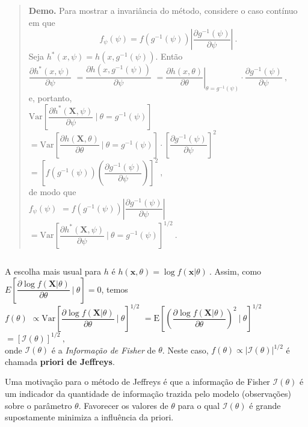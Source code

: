\documentclass[
]{book}
\begin{document}
\begin{quote}
\textbf{Demo.} Para mostrar a invariância do método, considere o caso contínuo em que
\[f_\psi(\psi) = f\left(g^{-1}(\psi)\right)\left|\dfrac{\partial g^{-1}(\psi)}{\partial\psi}\right|~.\]
Seja \(h^*(x,\psi)=h\left(x,g^{-1}(\psi)\right)\). Então\\
\(\dfrac{\partial h^*(x,\psi)}{\partial\psi}\)
\(=\dfrac{\partial h\left(x,g^{-1}(\psi)\right)}{\partial\psi}\)
\(=\left.\dfrac{\partial h(x,\theta)}{\partial\theta}\right|_{\theta=g^{-1}(\psi)}\cdot\dfrac{\partial g^{-1}(\psi)}{\partial\psi}~,\)\\
e, portanto,\\
\(\text{Var}\left[\dfrac{\partial h^*(\boldsymbol{X},\psi)}{\partial\psi}~\bigg|~\theta=g^{-1}(\psi)\right]\)
\(=\text{Var}\left[\dfrac{\partial h(\boldsymbol{X},\theta)}{\partial\theta}~\bigg|~\theta=g^{-1}(\psi)\right]\cdot\left[\dfrac{\partial g^{-1}(\psi)}{\partial\psi}\right]^2\)
\(=\left[f\left(g^{-1}(\psi)\right)\left(\dfrac{\partial g^{-1}(\psi)}{\partial\psi}\right)\right]^2~,\)\\
de modo que\\
\(f_\psi(\psi)\) \(=f\left(g^{-1}(\psi)\right)\left|\dfrac{\partial g^{-1}(\psi)}{\partial\psi}\right|\)
\(=\text{Var}\left[\dfrac{\partial h^*(\boldsymbol{X},\psi)}{\partial\psi}~\bigg|~\theta=g^{-1}(\psi)\right]^{1/2}~.\)
\end{quote}

\(~\)

A escolha mais usual para \(h\) é \(h(\boldsymbol{x},\theta)=\log f(\boldsymbol{x}|\theta)~.\) Assim, como \(E\left[\dfrac{\partial \log f(\boldsymbol{X}|\theta)}{\partial\theta}~\bigg|~\theta\right]=0\), temos\\
\(f(\theta)\)
\(\propto\text{Var}\left[\dfrac{\partial \log f(\boldsymbol{X}|\theta)}{\partial\theta}~\bigg|~\theta\right]^{1/2}\)
\(=\text{E}\left[\left(\dfrac{\partial \log f(\boldsymbol{X}|\theta)}{\partial\theta}\right)^2~\bigg|~\theta\right]^{1/2}\)
\(=\left[\mathcal{I}(\theta)\right]^{1/2}~,\)\\
onde \(\mathcal{I}(\theta)\) é a \emph{Informação de Fisher} de \(\theta\). Neste caso, \(f(\theta)\propto\big|\mathcal{I}(\theta)\big|^{1/2}\) é chamada \textbf{priori de Jeffreys}.

Uma motivação para o método de Jeffreys é que a informação de Fisher \(\mathcal{I}(\theta)\) é um indicador da quantidade de informação trazida pelo modelo (observações) sobre o parâmetro \(\theta\). Favorecer os valores de \(\theta\) para o qual \(\mathcal{I}(\theta)\) é grande supostamente minimiza a influência da priori.
\end{document}

